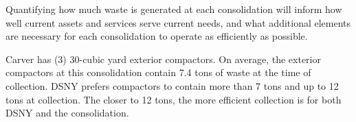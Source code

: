 
    Quantifying how much waste is generated at each consolidation will inform how well current assets and services serve current needs, and what additional elements are necessary for each consolidation to operate as efficiently as possible.
    
    Carver has (3) 30-cubic yard exterior compactors. On average, the exterior compactors at this consolidation contain 7.4 tons of waste at the time of collection. DSNY prefers compactors to contain more than 7 tons and up to 12 tons at collection. The closer to 12 tons, the more efficient collection is for both DSNY and the consolidation.